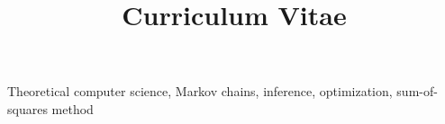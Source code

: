 \documentclass[a4paper,skipsamekey,11pt,english]{curve}
\title{Curriculum Vitae}
\begin{document}
\makeheaders[c]


\vspace{-2mm}
Theoretical computer science, Markov chains, inference, optimization, sum-of-squares method




\vspace{-4mm}


\vspace{-2mm}




\vspace{-2mm}


\vspace{-2mm}

\vspace{-2mm}



% 
\end{document}
